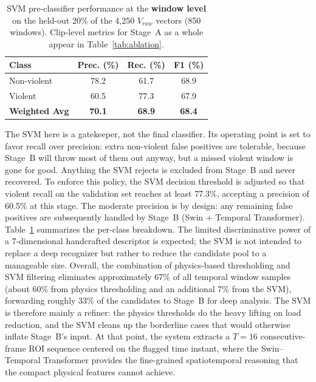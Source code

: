 \documentclass[conference]{IEEEtran}
\begin{document}
\begin{table}[!htbp]
\centering
\caption{SVM pre-classifier performance at the \textbf{window level} on the held-out 20\% of the 4{,}250 $V_{raw}$ vectors (850 windows). Clip-level metrics for Stage~A as a whole appear in Table~\ref{tab:ablation}.}
\label{tab:svm_performance}
\begin{tabular}{lccc}
\hline
\textbf{Class} & \textbf{Prec. (\%)} & \textbf{Rec. (\%)} & \textbf{F1 (\%)} \\
\hline
Non-violent & 78.2 & 61.7 & 68.9 \\
Violent     & 60.5 & 77.3 & 67.9 \\
\hline
\textbf{Weighted Avg} & \textbf{70.1} & \textbf{68.9} & \textbf{68.4} \\
\hline
\end{tabular}
\end{table}

The SVM here is a gatekeeper, not the final classifier. Its operating point is set to favor recall over precision: extra non-violent false positives are tolerable, because Stage~B will throw most of them out anyway, but a missed violent window is gone for good. Anything the SVM rejects is excluded from Stage~B and never recovered. To enforce this policy, the SVM decision threshold is adjusted so that violent recall on the validation set reaches at least 77.3\%,
accepting a precision of 60.5\%
at this stage. The moderate precision is by design: any remaining false positives are subsequently handled by Stage~B (Swin + Temporal Transformer). Table~\ref{tab:svm_performance} summarizes the per-class breakdown. The limited discriminative power of a 7-dimensional handcrafted descriptor is expected; the SVM is not intended to replace a deep recognizer but rather to reduce the candidate pool to a manageable size. Overall, the combination of physics-based thresholding and SVM filtering eliminates approximately 67\%
of all temporal window samples (about 60\% from physics thresholding and an additional 7\% from the SVM), forwarding roughly 33\%
of the candidates to Stage~B for deep analysis. The SVM is therefore mainly a refiner: the physics thresholds do the heavy lifting on load reduction, and the SVM cleans up the borderline cases that would otherwise inflate Stage~B's input. At that point, the system extracts a $T = 16$ consecutive-frame ROI sequence centered on the flagged time instant, where the Swin--Temporal Transformer provides the fine-grained spatiotemporal reasoning that the compact physical features cannot achieve.
\end{document}
